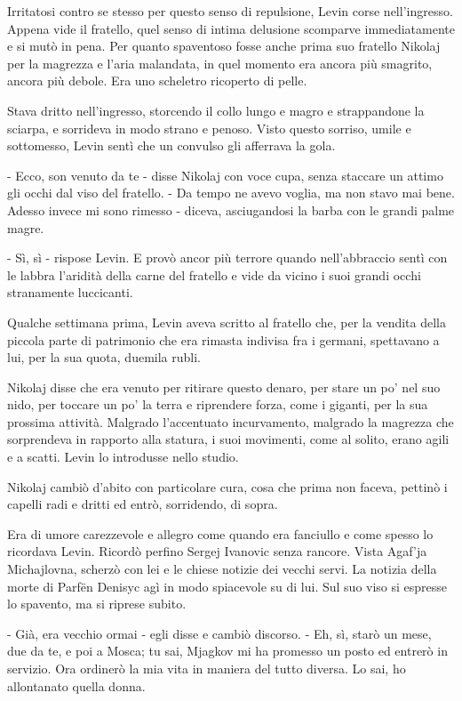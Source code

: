 Irritatosi contro se stesso per questo senso di repulsione, Levin corse nell'ingresso. Appena vide il fratello, quel senso di intima delusione scomparve immediatamente e si mutò in pena. Per quanto spaventoso fosse anche prima suo fratello Nikolaj per la magrezza e l'aria malandata, in quel momento era ancora più smagrito, ancora più debole. Era uno scheletro ricoperto di pelle. 

Stava dritto nell'ingresso, storcendo il collo lungo e magro e strappandone la sciarpa, e sorrideva in modo strano e penoso. Visto questo sorriso, umile e sottomesso, Levin sentì che un convulso gli afferrava la gola. 

- Ecco, son venuto da te - disse Nikolaj con voce cupa, senza staccare un attimo gli occhi dal viso del fratello. - Da tempo ne avevo voglia, ma non stavo mai bene. Adesso invece mi sono rimesso - diceva, asciugandosi la barba con le grandi palme magre. 

- Sì, sì - rispose Levin. E provò ancor più terrore quando nell'abbraccio sentì con le labbra l'aridità della carne del fratello e vide da vicino i suoi grandi occhi stranamente luccicanti. 

Qualche settimana prima, Levin aveva scritto al fratello che, per la vendita della piccola parte di patrimonio che era rimasta indivisa fra i germani, spettavano a lui, per la sua quota, duemila rubli. 

Nikolaj disse che era venuto per ritirare questo denaro, per stare un po' nel suo nido, per toccare un po' la terra e riprendere forza, come i giganti, per la sua prossima attività. Malgrado l'accentuato incurvamento, malgrado la magrezza che sorprendeva in rapporto alla statura, i suoi movimenti, come al solito, erano agili e a scatti. Levin lo introdusse nello studio. 

Nikolaj cambiò d'abito con particolare cura, cosa che prima non faceva, pettinò i capelli radi e dritti ed entrò, sorridendo, di sopra. 

Era di umore carezzevole e allegro come quando era fanciullo e come spesso lo ricordava Levin. Ricordò perfino Sergej Ivanovic senza rancore. Vista Agaf'ja Michajlovna, scherzò con lei e le chiese notizie dei vecchi servi. La notizia della morte di Parfën Denisyc agì in modo spiacevole su di lui. Sul suo viso si espresse lo spavento, ma si riprese subito. 

- Già, era vecchio ormai - egli disse e cambiò discorso. - Eh, sì, starò un mese, due da te, e poi a Mosca; tu sai, Mjagkov mi ha promesso un posto ed entrerò in servizio. Ora ordinerò la mia vita in maniera del tutto diversa. Lo sai, ho allontanato quella donna. 

